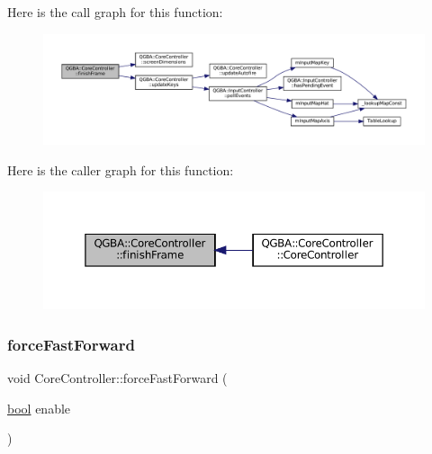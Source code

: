 Here is the call graph for this function\+:
\nopagebreak
\begin{figure}[H]
\begin{center}
\leavevmode
\includegraphics[width=350pt]{class_q_g_b_a_1_1_core_controller_a6cce655789c611379527dafbd9726109_cgraph}
\end{center}
\end{figure}
Here is the caller graph for this function\+:
\nopagebreak
\begin{figure}[H]
\begin{center}
\leavevmode
\includegraphics[width=350pt]{class_q_g_b_a_1_1_core_controller_a6cce655789c611379527dafbd9726109_icgraph}
\end{center}
\end{figure}
\mbox{\label{class_q_g_b_a_1_1_core_controller_a0dc263f0a6801dc195c4e3ce7500336b}} 
\subsubsection{\texorpdfstring{force\+Fast\+Forward}{forceFastForward}}
{\footnotesize\ttfamily void Core\+Controller\+::force\+Fast\+Forward (\begin{DoxyParamCaption}\item[{\mbox{\hyperlink{libretro_8h_a4a26dcae73fb7e1528214a068aca317e}{bool}}}]{enable }\end{DoxyParamCaption})\hspace{0.3cm}{\ttfamily [slot]}}

